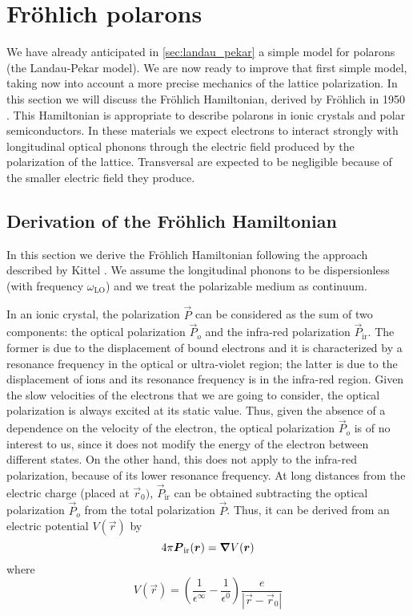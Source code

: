 \section{Fr\"{o}hlich polarons}
We have already anticipated in \cref{sec:landau_pekar} a simple model for polarons (the Landau-Pekar model). We are now ready to improve that first simple model, taking now into account a more precise mechanics of the lattice polarization. In this section we will discuss the Fr\"ohlich Hamiltonian, derived by Fr\"{o}hlich in 1950 \cite{frohlich1950}. This Hamiltonian is appropriate to describe polarons in ionic crystals and polar semiconductors. In these materials we expect electrons to interact strongly with longitudinal optical phonons through the electric field produced by the polarization of the lattice. Transversal are expected to be negligible because of the smaller electric field they produce.

\subsection{Derivation of the Fr\"{o}hlich Hamiltonian}
In this section we derive the Fr\"{o}hlich Hamiltonian following the approach described by Kittel \cite{kittel1987}. We assume the longitudinal phonons to be dispersionless (with frequency $\omega_\text{LO}$) and we treat the polarizable medium as continuum.

In an ionic crystal, the polarization $\vec{P}$ can be considered as the sum of two components: the optical polarization $\vec{P}_o$ and the infra-red polarization $\vec{P}_\text{ir}$. The former is due to the displacement of bound electrons and it is characterized by a resonance frequency in the optical or ultra-violet region; the latter is due to the displacement of ions and its resonance frequency is in the infra-red region. Given the slow velocities of the electrons that we are going to consider, the optical polarization is always excited at its static value. Thus, given the absence of a dependence on the velocity of the electron, the optical polarization $\vec{P}_o$ is of no interest to us, since it does not modify the energy of the electron between different states. On the other hand, this does not apply to the infra-red polarization, because of its lower resonance frequency. At long distances from the electric charge (placed at $\vec{r}_0)$, $\vec{P}_\text{ir}$ can be obtained subtracting the optical polarization $\vec{P}_o$ from the total polarization $\vec{P}$. Thus, it can be derived from an electric potential $V(\vec{r})$ by
\begin{equation} \label{eq:polarization_potential}
    4\pi\mathbf{\boldsymbol{P}}_\text{ir}(\mathbf{\boldsymbol{r}}) = \grad V(\mathbf{\boldsymbol{r}})
\end{equation}
where
\begin{equation}
    V(\vec{r}) = \left( \frac{1}{\epsilon^\infty} - \frac{1}{\epsilon^0}\right) \frac{e}{|\vec{r}-\vec{r}_0|}
\end{equation}

